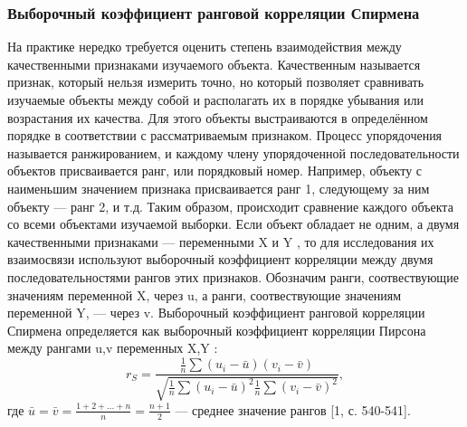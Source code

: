 \subsubsection{Выборочный коэффициент ранговой корреляции Спирмена}
На практике нередко требуется оценить степень взаимодействия между качественными признаками изучаемого объекта. Качественным называется признак, который нельзя измерить точно, но который позволяет сравнивать изучаемые объекты между собой и располагать их в порядке убывания или возрастания их качества. Для этого объекты выстраиваются в определённом порядке в соответствии с рассматриваемым признаком. Процесс упорядочения называется ранжированием, и каждому члену упорядоченной последовательности объектов присваивается ранг, или порядковый номер. Например, объекту с наименьшим значением признака присваивается ранг 1, следующему за ним объекту — ранг 2, и т.д. Таким образом, происходит сравнение каждого объекта со всеми объектами изучаемой выборки.
\newline
Если объект обладает не одним, а двумя качественными признаками — переменными X и Y , то для исследования их взаимосвязи используют выборочный коэффициент корреляции между двумя последовательностями рангов этих признаков.
\newline
Обозначим ранги, соотвествующие значениям переменной X, через u, а ранги, соотвествующие значениям переменной Y, — через v.
\newline
Выборочный коэффициент ранговой корреляции Спирмена определяется как выборочный коэффициент корреляции Пирсона между рангами u,v переменных X,Y :
\begin{equation}
r_{S} = \frac{
	\frac{1}{n}\sum{(u_{i} - \bar{u})(v_{i}-\bar{v})}
}{
	\sqrt{\frac{1}{n}\sum{(u_{i} - \bar{u})^{2}}\frac{1}{n}\sum{(v_{i} - \bar{v})^{2}}}
},
\label{rS}
\end{equation}
где $\bar{u} = \bar{v} = \frac{1 + 2 + ... + n}{n} = \frac{n + 1}{2}$ — среднее значение рангов [1, с. 540-541].





